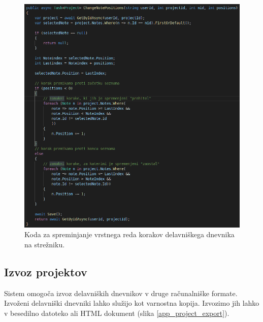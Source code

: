 \documentclass[a4paper, 12pt]{book}
\begin{document}
\begin{figure}[H]
\begin{center}
	\includegraphics[width=13.5cm]{api_code_changepos}
\end{center}
	\caption{Koda za spreminjanje vrstnega reda korakov delavniškega dnevnika na strežniku.}
\label{api_code_changepos}
\end{figure}



\subsection{Izvoz projektov}

Sistem omogoča izvoz delavniških dnevnikov v druge računalniške formate.
Izvoženi delavniški dnevniki lahko služijo kot varnostna kopija.
Izvozimo jih lahko v besedilno datoteko ali HTML dokument (slika \ref{app_project_export}).
\end{document}
